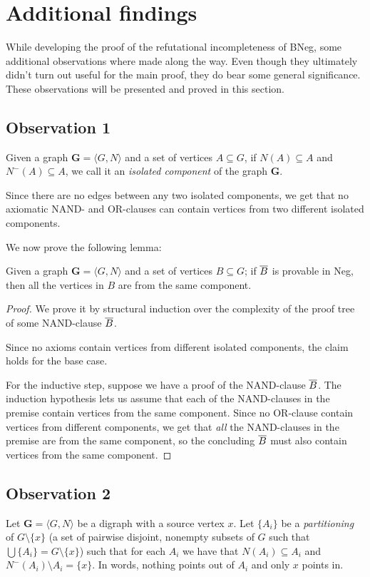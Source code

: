 \section{Additional findings}
\label{sec:Additional findings}
While developing the proof of the refutational incompleteness of BNeg, some additional observations where made along the way.
Even though they ultimately didn't turn out useful for the main proof, they do bear some general significance.
These observations will be presented and proved in this section.

\subsection{Observation 1}
\label{sub:Observation 1}
Given a graph $\mathbf{G} = \langle G,N \rangle$ and a set of vertices $A \subseteq G$, if $N(A) \subseteq A$ and $N^-(A) \subseteq A$, we call it an \textit{isolated component} of the graph $\mathbf{G}$.

Since there are no edges between any two isolated components, we get that no axiomatic NAND- and OR-clauses can contain vertices from two different isolated components.

We now prove the following lemma:
\begin{lemma}
  Given a graph $\mathbf{G} = \langle G,N \rangle$ and a set of vertices $B \subseteq G$; if $\ol{B}$ is provable in Neg, then all the vertices in $B$ are from the same component.
\end{lemma}
\begin{proof}
  We prove it by structural induction over the complexity of the proof tree of some NAND-clause $\ol{B}$.

  Since no axioms contain vertices from different isolated components, the claim holds for the base case.

  For the inductive step, suppose we have a proof of the NAND-clause $\ol{B}$.
  The induction hypothesis lets us assume that each of the NAND-clauses in the premise contain vertices from the same component.
  Since no OR-clause contain vertices from different components, we get that \textit{all} the NAND-clauses in the premise are from the same component, so the concluding $\ol{B}$ must also contain vertices from the same component.
\end{proof}
\subsection{Observation 2}
\label{sub:Observation 2}
Let $\mathbf{G} = \langle G,N \rangle$ be a digraph with a source vertex $x$.
Let $\{A_i\}$ be a \textit{partitioning} of $G \setminus \{ x \}$ (a set of pairwise disjoint, nonempty subsets of $G$ such that $\bigcup \{A_i\} = G \setminus \{ x \}$) such that for each $A_i$ we have that $N(A_i) \subseteq A_i$ and $N^-(A_i) \setminus A_i = \{ x \}$.
In words, nothing points out of $A_i$ and only $x$ points in.

